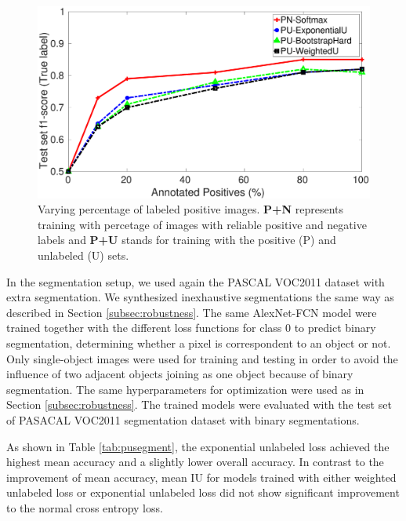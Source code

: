 \begin{figure}[t]
\centering
   \includegraphics[width=\linewidth]{img/pu_vs_pn}
\caption{Varying percentage of labeled positive images. \textbf{P+N} represents training with percetage of images with reliable positive and negative labels and \textbf{P+U} stands for training with the positive (P) and unlabeled (U) sets.}
\label{fig:pct_annotating}
\end{figure}

\noindent
In the segmentation setup, we used again the PASCAL VOC2011 dataset with extra segmentation\cite{hariharan2011semantic}.
We synthesized inexhaustive segmentations the same way as described in Section \ref{subsec:robustness}.
The same AlexNet-FCN model were trained together with the different loss functions for class 0 to predict binary segmentation, determining whether a pixel is correspondent to an object or not.
Only single-object images were used for training and testing in order to avoid the influence of two adjacent objects joining as one object because of  binary segmentation.
The same hyperparameters for optimization were used as in Section \ref{subsec:robustness}.
The trained models were evaluated with the test set of PASACAL VOC2011 segmentation dataset with binary segmentations.

\noindent
As shown in Table \ref{tab:pusegment}, the exponential unlabeled loss achieved the highest mean accuracy and a slightly lower overall accuracy.
In contrast to the improvement of mean accuracy, mean IU for models trained with either weighted unlabeled loss or exponential unlabeled loss did not show significant improvement to the normal cross entropy loss.


